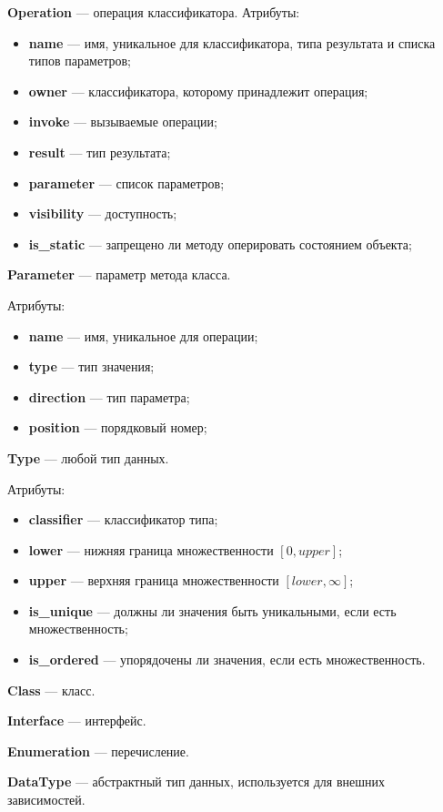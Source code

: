 \textbf{Operation} --- операция классификатора.
Атрибуты:
\begin{itemize}
\item \textbf{name} --- имя, уникальное для классификатора, типа результата и списка типов параметров;
\item \textbf{owner} --- классификатора, которому принадлежит операция;
\item \textbf{invoke} --- вызываемые операции;
\item \textbf{result} --- тип результата;
\item \textbf{parameter} --- список параметров;
\item \textbf{visibility} --- доступность;
\item \textbf{is\_static} --- запрещено ли методу оперировать состоянием объекта;
\end{itemize}

\textbf{Parameter} --- параметр метода класса.

Атрибуты:
\begin{itemize}
\item \textbf{name} --- имя, уникальное для операции;
\item \textbf{type} --- тип значения;
\item \textbf{direction} --- тип параметра;
\item \textbf{position} --- порядковый номер;
\end{itemize}

\textbf{Type} --- любой тип данных.

Атрибуты:
\begin{itemize}
\item \textbf{classifier} --- классификатор типа;
\item \textbf{lower} --- нижняя граница множественности $\left [ 0, upper \right ]$;
\item \textbf{upper} --- верхняя граница множественности $\left [ lower, \infty \right ]$;
\item \textbf{is\_unique} --- должны ли значения быть уникальными, если есть множественность;
\item \textbf{is\_ordered} --- упорядочены ли значения, если есть множественность.
\end{itemize}

\textbf{Class} --- класс.

\textbf{Interface} --- интерфейс.

\textbf{Enumeration} --- перечисление.

\textbf{DataType} --- абстрактный тип данных, используется для внешних зависимостей.

